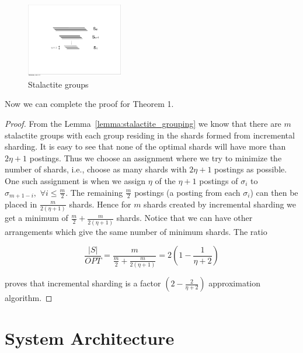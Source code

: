 \begin{figure}[tb]
  	\centering
		\includegraphics[width=0.375\textwidth]{resources/stalagtite_grp.pdf}
   	\caption{Stalactite groups}
		  \label{fig:stalactite_groups}	
\end{figure} 

Now we can complete the proof for Theorem 1.%

\begin{proof}{}
	From the Lemma~\ref{lemma:stalactite_grouping} we know that there are $m$ stalactite groups with each group residing in the shards formed from incremental sharding. It is easy to see that none of the optimal shards will have more than $2\eta + 1$ postings. Thus we choose an assignment where we try to minimize the number of shards, i.e., choose as many shards with $2\eta + 1$ postings as possible. One such assignment is when we assign $\eta$ of the $\eta+1$ postings of $\sigma_i$ to $\sigma_{m+1-i}, \,\, \forall i \leq \frac{m}{2}$. The remaining $\frac{m}{2}$ postings (a posting from each $\sigma_i$) can then be placed in $\frac{m}{2(\eta+1)}$ shards. Hence for $m$ shards created by incremental sharding  we get a minimum of $\frac{m}{2} + \frac{m}{2(\eta+1)}$ shards. Notice that we can have other arrangements which give the same number of minimum shards. The ratio 

	$$
		\frac{|S|}{OPT} = \frac{m}{\frac{m}{2} + \frac{m}{2(\eta+1)}} 
						= 2 \left(1 - \frac{1}{\eta + 2}\right)
	$$

	proves that incremental sharding is a factor $(2  -  \frac{2}{\eta+2})$ approximation algorithm.
\end{proof}


\section{System Architecture}
\label{chap:sharding:sec:system}

